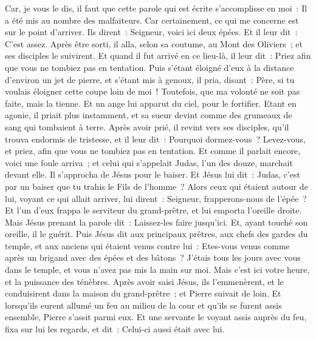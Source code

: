 \begin{multicols}{2}
Car, je vous le dis, il faut que cette parole qui est écrite s'accomplisse en moi~: Il a été mis au nombre des malfaiteurs. Car certainement, ce qui me concerne est sur le point d'arriver.
Ils dirent~: Seigneur, voici ici deux épées. Et il leur dit~: C'est assez.
Après être sorti, il alla, selon sa coutume, au Mont des Oliviers~; et ses disciples le suivirent.
Et quand il fut arrivé en ce lieu-là, il leur dit~: Priez afin que vous ne tombiez pas en tentation.
Puis s'étant éloigné d'eux à la distance d'environ un jet de pierre, et s'étant mis à genoux, il pria,
disant~: Père, si tu voulais éloigner cette coupe loin de moi~! Toutefois, que ma volonté ne soit pas faite, mais la tienne.
Et un ange lui apparut du ciel, pour le fortifier.
Etant en agonie, il priait plus instamment, et sa sueur devint comme des grumeaux de sang qui tombaient à terre.
Après avoir prié, il revint vers ses disciples, qu'il trouva endormis de tristesse,
et il leur dit~: Pourquoi dormez-vous~? Levez-vous, et priez, afin que vous ne tombiez pas en tentation.
Et comme il parlait encore, voici une foule arriva~; et celui qui s'appelait Judas, l'un des douze, marchait devant elle. Il s'approcha de Jésus pour le baiser.
Et Jésus lui dit~: Judas, c'est par un baiser que tu trahis le Fils de l'homme~?
Alors ceux qui étaient autour de lui, voyant ce qui allait arriver, lui dirent~: Seigneur, frapperons-nous de l'épée~?
Et l'un d'eux frappa le serviteur du grand-prêtre, et lui emporta l'oreille droite.
Mais Jésus prenant la parole dit~: Laissez-les faire jusqu'ici. Et, ayant touché son oreille, il le guérit.
Puis Jésus dit aux principaux prêtres, aux chefs des gardes du temple, et aux anciens qui étaient venus contre lui~: Etes-vous venus comme après un brigand avec des épées et des bâtons~?
J'étais tous les jours avec vous dans le temple, et vous n'avez pas mis la main sur moi. Mais c'est ici votre heure, et la puissance des ténèbres.
Après avoir saisi Jésus, ils l'emmenèrent, et le conduisirent dans la maison du grand-prêtre~; et Pierre suivait de loin.
Et lorsqu'ils eurent allumé un feu au milieu de la cour et qu'ils se furent assis ensemble, Pierre s'assit parmi eux.
Et une servante le voyant assis auprès du feu, fixa sur lui les regards, et dit~: Celui-ci aussi était avec lui.

\end{multicols}
